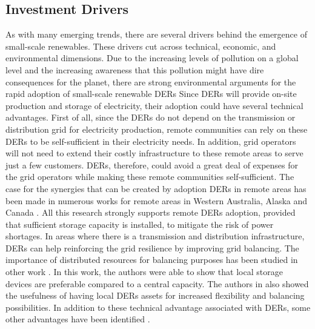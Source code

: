  \subsection{Investment Drivers}
 As with many emerging trends, there are several drivers behind the emergence of small-scale renewables. These drivers cut across technical, economic, and environmental dimensions. Due to the increasing levels of pollution on a global level and the increasing awareness that this pollution might have dire consequences for the planet, there are strong environmental arguments for the rapid adoption of small-scale renewable DERs
 \newline \newline \noindent
 Since DERs will provide on-site production and storage of electricity, their adoption could have several technical advantages. First of all, since the DERs do not depend on the transmission or distribution grid for electricity production, remote communities can rely on these DERs to be self-sufficient in their electricity needs. In addition, grid operators will not need to extend their costly infrastructure to these remote areas to serve just a few customers. DERs, therefore, could avoid a great deal of expenses for the grid operators while making these remote communities self-sufficient. The case for the synergies that can be created by adoption DERs in remote areas has been made in numerous works for remote areas in Western Australia, Alaska and Canada \cite{remote1,remote2,remote3}. All this research strongly supports remote DERs adoption, provided that sufficient storage capacity is installed, to mitigate the risk of power shortages.
 \newline \newline \noindent
 In areas where there is a transmission and distribution infrastructure, DERs can help reinforcing the grid resilience by improving grid balancing. The importance of distributed resources for balancing purposes has been studied in other work \cite{balancing}. In this work, the authors were able to show that local storage devices are preferable compared to a central capacity. The authors in \cite{balancing2} also showed the usefulness of having local DERs assets for increased flexibility and balancing possibilities. In addition to these technical advantage associated with DERs, some other advantages have been identified \cite{technical}.  
 \newline \newline \noindent
